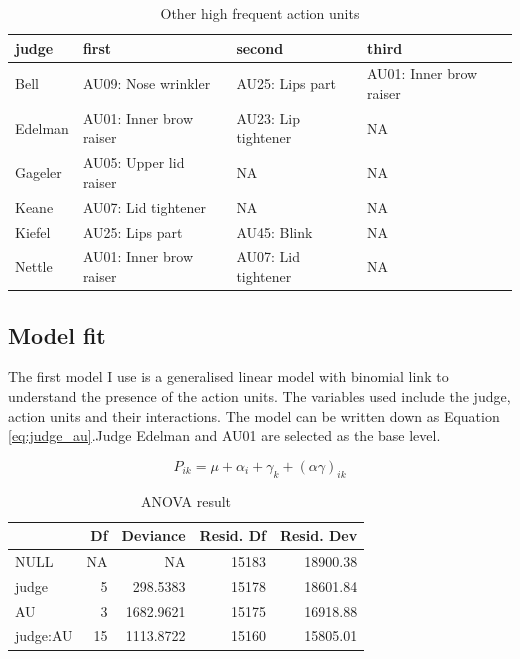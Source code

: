 \documentclass{monashthesis}
\begin{document}
\begin{table}[t]

\caption{\label{tab:unnamed-chunk-7}\label{tab:other_highf} Other high frequent action units }
\centering
\begin{tabular}{l|l|l|l}
\hline
judge & first & second & third\\
\hline
Bell & AU09: Nose wrinkler & AU25: Lips part & AU01: Inner brow raiser\\
\hline
Edelman & AU01: Inner brow raiser & AU23: Lip tightener & NA\\
\hline
Gageler & AU05: Upper lid raiser & NA & NA\\
\hline
Keane & AU07: Lid tightener & NA & NA\\
\hline
Kiefel & AU25: Lips part & AU45: Blink & NA\\
\hline
Nettle & AU01: Inner brow raiser & AU07: Lid tightener & NA\\
\hline
\end{tabular}
\end{table}

\hypertarget{model-fit}{%
\subsection{Model fit}\label{model-fit}}

The first model I use is a generalised linear model with binomial link to understand the presence of the action units. The variables used include the judge, action units and their interactions. The model can be written down as Equation \ref{eq:judge_au}.Judge Edelman and AU01 are selected as the base level.

\begin{equation}\label{eq:judge_au}
P_{ik} = \mu + \alpha_i + \gamma_k + (\alpha\gamma)_{ik}
\end{equation}

\begin{table}[t]

\caption{\label{tab:anova}\label{tab:anova}ANOVA result}
\centering
\begin{tabular}{l|r|r|r|r}
\hline
  & Df & Deviance & Resid. Df & Resid. Dev\\
\hline
NULL & NA & NA & 15183 & 18900.38\\
\hline
judge & 5 & 298.5383 & 15178 & 18601.84\\
\hline
AU & 3 & 1682.9621 & 15175 & 16918.88\\
\hline
judge:AU & 15 & 1113.8722 & 15160 & 15805.01\\
\hline
\end{tabular}
\end{table}
\end{document}
